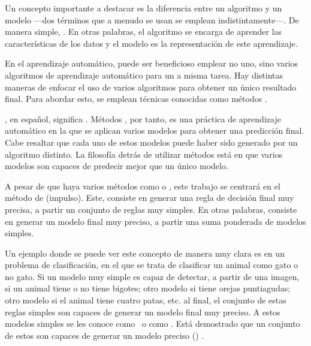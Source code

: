 Un concepto importante a destacar es la diferencia entre un algoritmo y un modelo ---dos términos que a menudo se usan se emplean indistintamente---. De manera simple, . En otras palabras, el algoritmo se encarga de aprender las características de los datos y el modelo es la representación de este aprendizaje. 



En el aprendizaje automático, puede ser beneficioso emplear no uno, sino varios algoritmos de aprendizaje automático para un a misma tarea. Hay distintas maneras de enfocar el uso de varios algoritmos para obtener un único resultado final. Para abordar esto, se emplean técnicas conocidas como métodos .

, en español, significa . Métodos , por tanto, es una práctica de aprendizaje automático en la que se aplican varios modelos para obtener una predicción final. Cabe resaltar que cada uno de estos modelos puede haber sido generado por un algoritmo distinto. La filosofía detrás de utilizar métodos  está en que varios modelos son capaces de predecir mejor que un único modelo. 

A pesar de que haya varios métodos  como  o , este trabajo se centrará en el método de  (impulso). Este, consiste en generar una regla de decisión final muy precisa, a partir un conjunto de reglas muy simples. En otras palabras,  consiste en generar un modelo final muy preciso, a partir una suma ponderada de modelos simples. 

Un ejemplo donde se puede ver este concepto de manera muy clara es en un problema de clasificación, en el que se trata de clasificar un animal como gato o no gato. Si un modelo muy simple es capaz de detectar, a partir de una imagen, si un animal tiene o no tiene bigotes; otro modelo si tiene orejas puntiagudas; otro modelo si el animal tiene cuatro patas, etc. al final, el conjunto de estas reglas simples son capaces de generar un modelo final muy preciso. A estos modelos simples se les conoce como \fnm\, o como . Está demostrado que un conjunto de estos son capaces de generar un modelo preciso () \parencite{weakLearnStrongLearn}.

